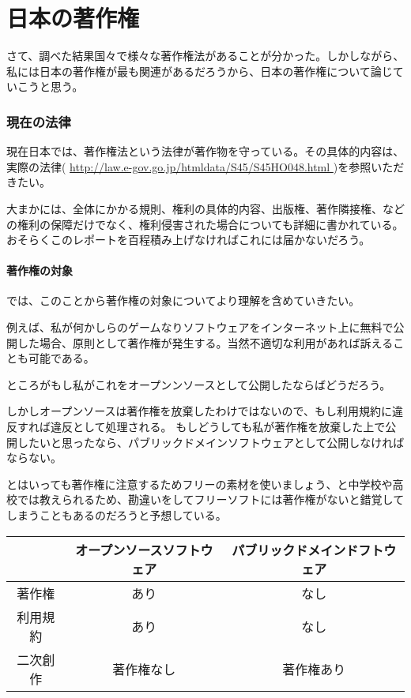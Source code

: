 \documentclass[a4j]{jsarticle}
\begin{document}
\part{日本の著作権}
さて、調べた結果国々で様々な著作権法があることが分かった。しかしながら、私には日本の著作権が最も関連があるだろうから、日本の著作権について論じていこうと思う。
\section*{現在の法律}
現在日本では、著作権法という法律が著作物を守っている。その具体的内容は、実際の法律( \url{ http://law.e-gov.go.jp/htmldata/S45/S45HO048.html } )を参照いただきたい。\par
大まかには、全体にかかる規則、権利の具体的内容、出版権、著作隣接権、などの権利の保障だけでなく、権利侵害された場合についても詳細に書かれている。おそらくこのレポートを百程積み上げなければこれには届かないだろう。
\subsection*{著作権の対象}
では、このことから著作権の対象についてより理解を含めていきたい。\par
例えば、私が何かしらのゲームなりソフトウェアをインターネット上に無料で公開した場合、原則として著作権が発生する。当然不適切な利用があれば訴えることも可能である。\par
ところがもし私がこれをオープンンソースとして公開したならばどうだろう。\par
しかしオープンソースは著作権を放棄したわけではないので、もし利用規約に違反すれば違反として処理される。\cite{def_oss}
もしどうしても私が著作権を放棄した上で公開したいと思ったなら、パブリックドメインソフトウェアとして公開しなければならない。 \cite{def_pds} \par
 とはいっても著作権に注意するためフリーの素材を使いましょう、と中学校や高校では教えられるため、勘違いをしてフリーソフトには著作権がないと錯覚してしまうこともあるのだろうと予想している。\par
\begin{center}
 \begin{tabular}{|c|c|c|} %
  \hline
 &オープンソースソフトウェア &パブリックドメインドフトウェア \\ \hline
 著作権&あり &なし \\  \hline
 利用規約&あり &なし \\ \hline
 二次創作&著作権なし &著作権あり \\ \hline
 \end{tabular} \cite{def_diff}
 \end{center}
\end{document}
